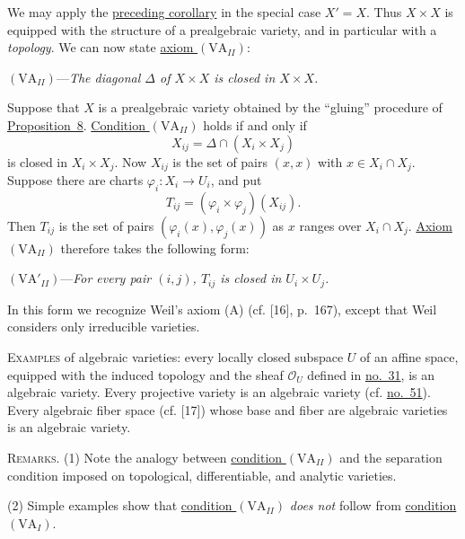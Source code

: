 We may apply the \hyperref[fac:II:1:no:34:cor:prop:8]{preceding corollary} in the special case $X'=X$. Thus $X\times X$ is equipped with the structure of a prealgebraic variety, and in particular with a \textit{topology}. We can now state \hyperref[fac:II:1:no:34:axiom:VA-II]{axiom $(\mathrm{VA}_{II})$}:

\label{fac:II:1:no:34:axiom:VA-II}
$(\mathrm{VA}_{II})$---\textit{The diagonal $\Delta$ of $X\times X$ is closed in $X\times X$.}

Suppose that $X$ is a prealgebraic variety obtained by the ``gluing'' procedure of \hyperref[fac:II:1:no:34:prop:8]{Proposition~8}. \hyperref[fac:II:1:no:34:axiom:VA-II]{Condition $(\mathrm{VA}_{II})$} holds if and only if
\[
X_{ij}=\Delta\cap(X_i\times X_j)
\]
is closed in $X_i\times X_j$. Now $X_{ij}$ is the set of pairs $(x,x)$ with $x\in X_i\cap X_j$. Suppose there are charts $\varphi_i:X_i\to U_i$, and put
\[
T_{ij}=(\varphi_i\times\varphi_j)(X_{ij}).
\]
Then $T_{ij}$ is the set of pairs $(\varphi_i(x),\varphi_j(x))$ as $x$ ranges over $X_i\cap X_j$. \hyperref[fac:II:1:no:34:axiom:VA-II]{Axiom $(\mathrm{VA}_{II})$} therefore takes the following form:

\label{fac:II:1:no:34:axiom:VA-II-prime}
$(\mathrm{VA}'_{II})$---\textit{For every pair $(i,j)$, $T_{ij}$ is closed in $U_i\times U_j$.}

In this form we recognize Weil's axiom (A) (cf. [16], p.~167), except that Weil considers only irreducible varieties.

\label{fac:II:1:no:34:examples}
\textsc{Examples} of algebraic varieties: every locally closed subspace $U$ of an affine space, equipped with the induced topology and the sheaf $\mathcal{O}_U$ defined in \hyperref[fac:II:1:no:31]{no.~31}, is an algebraic variety. Every projective variety is an algebraic variety (cf. \hyperref[fac:III:1:no:51]{no.~51}). Every algebraic fiber space (cf. [17]) whose base and fiber are algebraic varieties is an algebraic variety.

\label{fac:II:1:no:34:remarks}
\textsc{Remarks.} \label{fac:II:1:no:34:remark:1}(1) Note the analogy between \hyperref[fac:II:1:no:34:axiom:VA-II]{condition $(\mathrm{VA}_{II})$} and the separation condition imposed on topological, differentiable, and analytic varieties.

\label{fac:II:1:no:34:remark:2}(2) Simple examples show that \hyperref[fac:II:1:no:34:axiom:VA-II]{condition $(\mathrm{VA}_{II})$} \textit{does not} follow from \hyperref[fac:II:1:no:34:axiom:VA-I]{condition $(\mathrm{VA}_I)$}.

